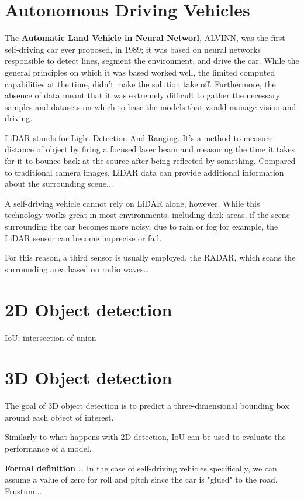 \newpage
\section{Autonomous Driving Vehicles}
The \textbf{Automatic Land Vehicle in Neural Networl}, ALVINN, was the first self-driving car ever proposed, in 1989; it was based on neural networks responsible to detect lines, segment the environment, and drive the car.
While the general principles on which it was based worked well, the limited computed capabilities at the time, didn't make the solution take off. Furthermore, the absence of data meant that it was extremely difficult to gather the necessary samples and datasets on which to base the models that would manage vision and driving.


LiDAR stands for Light Detection And Ranging. It's a method to measure distance of object by firing a focused laser beam and measuring the time it takes for it to bounce back at the source after being reflected by something.
Compared to traditional camera images, LiDAR data can provide additional information about the surrounding scene...

A self-driving vehicle cannot rely on LiDAR alone, however. While this technology works great in most environments, including dark areas, if the scene surrounding the car becomes more noisy, due to rain or fog for example, the LiDAR sensor can become imprecise or fail.

For this reason, a third sensor is usually employed, the RADAR, which scans the surrounding area based on radio waves\dots

\section{2D Object detection}
IoU: intersection of union





\section{3D Object detection}
The goal of 3D object detection is to predict a three-dimensional bounding box around each object of interest.

Similarly to what happens with 2D detection, IoU can be used to evaluate the performance of a model.


\textbf{Formal definition}
\dots
In the case of self-driving vehicles specifically, we can assume a value of zero for roll and pitch since the car is "glued" to the road.
Frustum...



